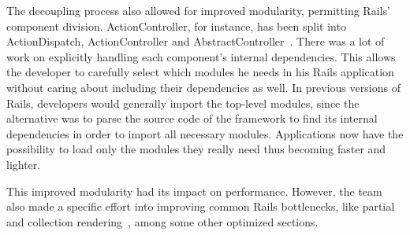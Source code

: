 The decoupling process also allowed for improved modularity, permitting Rails' component division. ActionController, for instance, has been split into ActionDispatch, ActionController and AbstractController~\cite{vaporware_to_awesome}. There was a lot of work on explicitly handling each component's internal dependencies. This allows the developer to carefully select which modules he needs in his Rails application without caring about including their dependencies as well. In previous versions of Rails, developers would generally import the top-level modules, since the alternative was to parse the source code of the framework to find its internal dependencies in order to import all necessary modules. Applications now have the possibility to load only the modules they really need thus becoming faster and lighter.

This improved modularity had its impact on performance. However, the team also made a specific effort into improving common Rails bottlenecks, like partial and collection rendering~\cite{vaporware_to_awesome}, among some other optimized sections.

